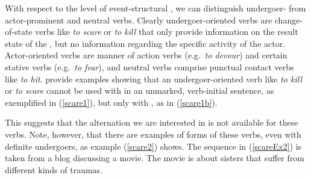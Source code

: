 \documentclass[output=paper,
,modfonts
,nonflat]{langsci/langscibook}
\begin{document}
With respect to the level of event-structural , we can distinguish un\-der\-goer- from actor-prominent and neutral verbs. Clearly undergoer-oriented verbs are change-of-state verbs like \textit{to scare} or \textit{to kill} that only provide information on the result state of the , but no information regarding the specific activity of the actor. Actor-oriented verbs are manner of action verbs (e.g.\ \textit{to devour}) and certain stative verbs (e.g.\ \textit{to fear}), and neutral verbs comprise punctual contact verbs like  \textit{to hit}. \cite{schpa72} provide examples showing that an undergoer-oriented verb like \textit{to kill} or \textit{to scare} cannot be used with  in an unmarked, verb-initial sentence, as exemplified in (\ref{scare1}), but only with , as in (\ref{scare1b}). 

\begin{exe}
\ex
\begin{xlist}
\end{xlist}
\end{exe}

\noindent This suggests that the  alternation we are interested in is not available for these verbs. Note, however, that there are examples of  forms of these verbs, even with definite undergoers, as example (\ref{scare2}) shows. The sequence in (\ref{scareEx2}) is taken from a blog discussing a movie. The movie is about sisters that suffer from different kinds of traumas. 
\end{document}
